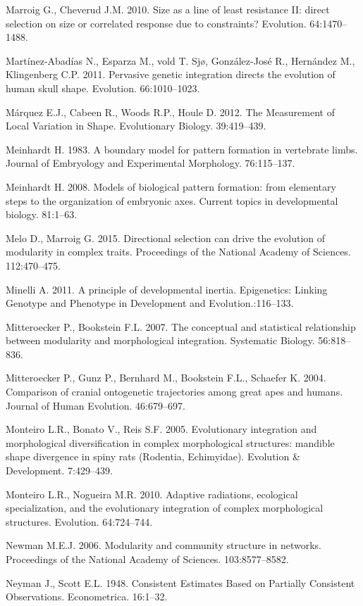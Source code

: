 \documentclass[12pt,]{article}
\begin{document}
Marroig G., Cheverud J.M. 2010. Size as a line of least resistance II:
direct selection on size or correlated response due to constraints?
Evolution. 64:1470--1488.

Martínez-Abadías N., Esparza M., vold T. Sjø, González-José R.,
Hernández M., Klingenberg C.P. 2011. Pervasive genetic integration
directs the evolution of human skull shape. Evolution. 66:1010--1023.

Márquez E.J., Cabeen R., Woods R.P., Houle D. 2012. The Measurement of
Local Variation in Shape. Evolutionary Biology. 39:419--439.

Meinhardt H. 1983. A boundary model for pattern formation in vertebrate
limbs. Journal of Embryology and Experimental Morphology. 76:115--137.

Meinhardt H. 2008. Models of biological pattern formation: from
elementary steps to the organization of embryonic axes. Current topics
in developmental biology. 81:1--63.

Melo D., Marroig G. 2015. Directional selection can drive the evolution
of modularity in complex traits. Proceedings of the National Academy of
Sciences. 112:470--475.

Minelli A. 2011. A principle of developmental inertia. Epigenetics:
Linking Genotype and Phenotype in Development and Evolution.:116--133.

Mitteroecker P., Bookstein F.L. 2007. The conceptual and statistical
relationship between modularity and morphological integration.
Systematic Biology. 56:818--836.

Mitteroecker P., Gunz P., Bernhard M., Bookstein F.L., Schaefer K. 2004.
Comparison of cranial ontogenetic trajectories among great apes and
humans. Journal of Human Evolution. 46:679--697.

Monteiro L.R., Bonato V., Reis S.F. 2005. Evolutionary integration and
morphological diversification in complex morphological structures:
mandible shape divergence in spiny rats (Rodentia, Echimyidae).
Evolution \& Development. 7:429--439.

Monteiro L.R., Nogueira M.R. 2010. Adaptive radiations, ecological
specialization, and the evolutionary integration of complex
morphological structures. Evolution. 64:724--744.

Newman M.E.J. 2006. Modularity and community structure in networks.
Proceedings of the National Academy of Sciences. 103:8577--8582.

Neyman J., Scott E.L. 1948. Consistent Estimates Based on Partially
Consistent Observations. Econometrica. 16:1--32.
\end{document}
